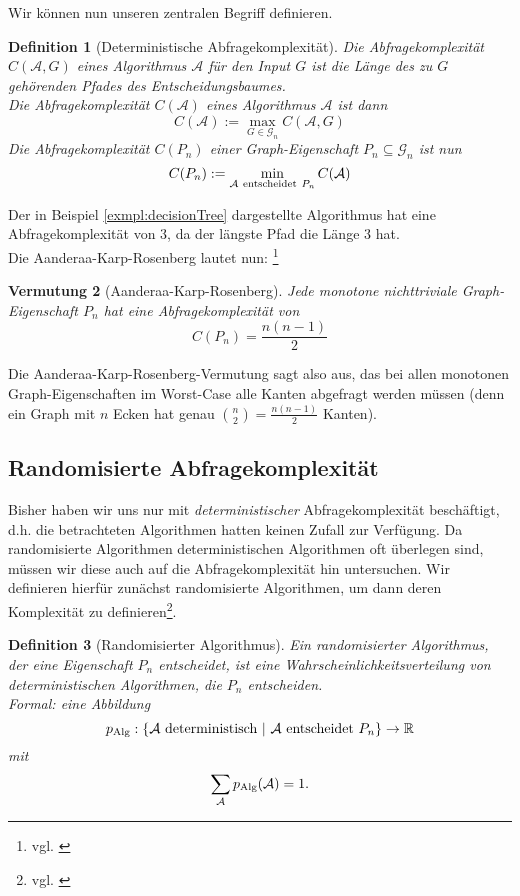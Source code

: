 \documentclass[10pt,a4paper, footheight=1mm]{scrreprt}
\newtheorem{definition}{Definition}
\newtheorem{conjecture}[definition]{Vermutung}
\theoremstyle{definition}
\begin{document}
Wir können nun unseren zentralen Begriff definieren.

\begin{definition}[Deterministische Abfragekomplexität]
Die \emph{Abfragekomplexität} $C(\mathcal{A},G)$ eines
Algorithmus $\mathcal{A}$ für den Input $G$ ist
die Länge des zu $G$ gehörenden Pfades des
Entscheidungsbaumes. \\
Die \emph{Abfragekomplexität} $C(\mathcal{A})$ eines
Algorithmus $\mathcal{A}$ ist dann
$$ C(\mathcal{A}) := \max_{G \in \mathcal{G}_n} C(\mathcal{A},G)$$
Die \emph{Abfragekomplexität} $C(P_n)$ einer Graph-Eigenschaft
$P_n\subseteq \mathcal{G}_n$ ist nun
$$ C(P_n) := \min_{\mathcal{A} \ {\rm entscheidet}\  P_n} C(\mathcal{A})$$
\end{definition}

Der in Beispiel \ref{exmpl:decisionTree} dargestellte
Algorithmus hat eine Abfragekomplexität von $3$, da
der längste Pfad die Länge $3$ hat. \\
Die Aanderaa-Karp-Rosenberg lautet nun:
\footnote{vgl. \cite[S.9]{Lovasz}}
\begin{conjecture}[Aanderaa-Karp-Rosenberg]
Jede monotone nichttriviale Graph-Eigenschaft $P_n$
hat eine Abfragekomplexität von
$$C(P_n) = \frac{n(n-1)}{2}$$
\end{conjecture}
Die Aanderaa-Karp-Rosenberg-Vermutung sagt also aus,
das bei allen monotonen Graph-Eigenschaften im Worst-Case
alle Kanten abgefragt werden müssen (denn ein Graph mit
$n$ Ecken hat genau ${\binom{n}{2}=\frac{n(n-1)}{2}}$ Kanten).

\subsection{Randomisierte Abfragekomplexität}

Bisher haben wir uns nur mit \emph{deterministischer}
Abfragekomplexität beschäftigt, d.h. die betrachteten
Algorithmen hatten keinen Zufall zur Verfügung.
Da randomisierte Algorithmen deterministischen Algorithmen
oft überlegen sind, müssen wir diese auch auf
die Abfragekomplexität hin untersuchen.
Wir definieren hierfür zunächst randomisierte Algorithmen,
um dann deren Komplexität zu definieren\footnote{vgl.
\cite[S.120]{Groeger}}.
\begin{definition}[Randomisierter Algorithmus]
Ein \emph{randomisierter Algorithmus}, der eine
Eigenschaft $P_n$ entscheidet, ist eine
Wahrscheinlichkeitsverteilung von deterministischen
Algorithmen, die $P_n$ entscheiden. \\
Formal: eine Abbildung
$$ p_\textup{Alg}: \{ \mathcal{A} \ \textup {deterministisch} \ | \
         \mathcal{A} \ {\rm entscheidet} \ P_n \} \to \mathbb{R} $$
mit 
$$\sum_\mathcal{A} p_\textup{Alg}(\mathcal{A}) = 1.$$
\end{definition}
\end{document}
